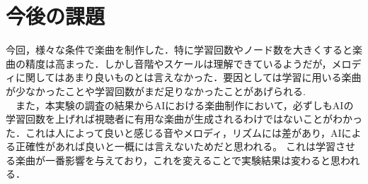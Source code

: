 \section{今後の課題}
今回，様々な条件で楽曲を制作した．特に学習回数やノード数を大きくすると楽曲の精度は高まった．しかし音階やスケールは理解できているようだが，メロディに関してはあまり良いものとは言えなかった．要因としては学習に用いる楽曲が少なかったことや学習回数がまだ足りなかったことがあげられる.\\
　また，本実験の調査の結果からAIにおける楽曲制作において，必ずしもAIの学習回数を上げれば視聴者に有用な楽曲が生成されるわけではないことがわかった．これは人によって良いと感じる音やメロディ，リズムには差があり，AIによる正確性があれば良いと一概には言えないためだと思われる。
これは学習させる楽曲が一番影響を与えており，これを変えることで実験結果は変わると思われる．